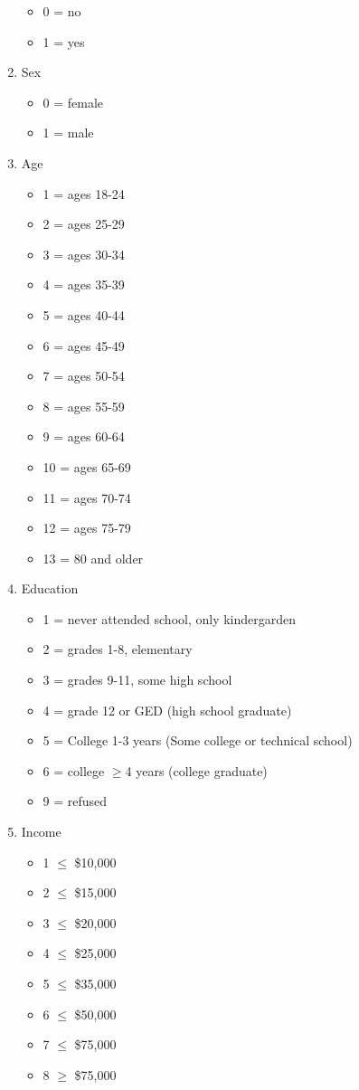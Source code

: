 \documentclass[journal]{IEEEtran}
\begin{document}
\begin{enumerate}
\begin{itemize}
    \item 0 = no
    \item 1 = yes
    \end{itemize}
\item  Sex 
\begin{itemize}
    \item 0 = female
    \item 1 = male
    \end{itemize}
\item  Age 
\begin{itemize}
    \item 1 = ages 18-24
    \item 2 = ages 25-29
    \item 3 = ages 30-34 
    \item 4 = ages 35-39
    \item 5 = ages 40-44
    \item 6 = ages 45-49
    \item 7 = ages 50-54
    \item 8 = ages 55-59
    \item 9 = ages 60-64
    \item 10 = ages 65-69
    \item 11 = ages 70-74
    \item 12 = ages 75-79
    \item 13 = 80 and older
    \end{itemize}
\item  Education 
\begin{itemize}
    \item 1 = never attended school, only kindergarden
    \item 2 = grades 1-8, elementary
    \item 3 = grades 9-11, some high school
    \item 4 = grade 12 or GED (high school graduate)
    \item 5 = College 1-3 years (Some college or technical school)
    \item 6 = college $\geq$4 years (college graduate)
    \item 9 = refused
    \end{itemize}
\item  Income 
\begin{itemize}
    \item 1 $\leq$ \$10,000
    \item 2 $\leq$ \$15,000
    \item 3 $\leq$ \$20,000 
    \item 4 $\leq$ \$25,000
    \item 5 $\leq$ \$35,000
    \item 6 $\leq$ \$50,000
    \item 7 $\leq$ \$75,000
    \item 8 $\geq$ \$75,000
    \end{itemize}
\end{enumerate}
\end{document}
